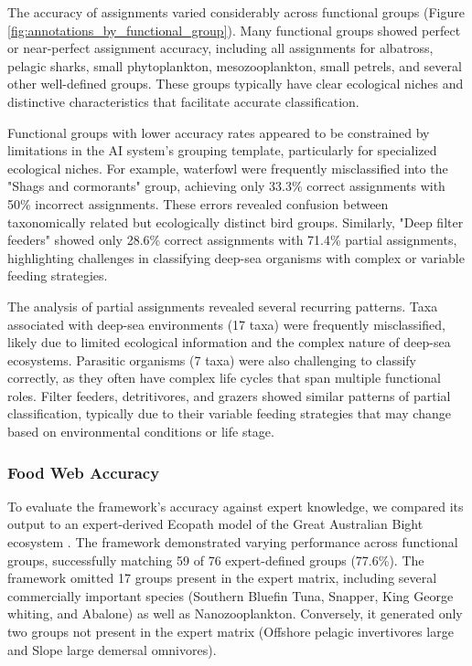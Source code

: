 The accuracy of assignments varied considerably across functional groups (Figure \ref{fig:annotations_by_functional_group}). Many functional groups showed perfect or near-perfect assignment accuracy, including all assignments for albatross, pelagic sharks, small phytoplankton, mesozooplankton, small petrels, and several other well-defined groups. These groups typically have clear ecological niches and distinctive characteristics that facilitate accurate classification.

Functional groups with lower accuracy rates appeared to be constrained by limitations in the AI system's grouping template, particularly for specialized ecological niches. For example, waterfowl were frequently misclassified into the "Shags and cormorants" group, achieving only 33.3\% correct assignments with 50\% incorrect assignments. These errors revealed confusion between taxonomically related but ecologically distinct bird groups. Similarly, "Deep filter feeders" showed only 28.6\% correct assignments with 71.4\% partial assignments, highlighting challenges in classifying deep-sea organisms with complex or variable feeding strategies.

The analysis of partial assignments revealed several recurring patterns. Taxa associated with deep-sea environments (17 taxa) were frequently misclassified, likely due to limited ecological information and the complex nature of deep-sea ecosystems. Parasitic organisms (7 taxa) were also challenging to classify correctly, as they often have complex life cycles that span multiple functional roles. Filter feeders, detritivores, and grazers showed similar patterns of partial classification, typically due to their variable feeding strategies that may change based on environmental conditions or life stage.

\subsubsection{Food Web Accuracy}
To evaluate the framework's accuracy against expert knowledge, we compared its output to an expert-derived Ecopath model of the Great Australian Bight ecosystem \citep{Fulton2018}. The framework demonstrated varying performance across functional groups, successfully matching 59 of 76 expert-defined groups (77.6\%). The framework omitted 17 groups present in the expert matrix, including several commercially important species (Southern Bluefin Tuna, Snapper, King George whiting, and Abalone) as well as Nanozooplankton. Conversely, it generated only two groups not present in the expert matrix (Offshore pelagic invertivores large and Slope large demersal omnivores).

